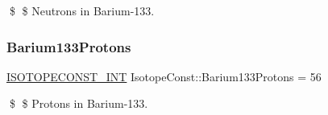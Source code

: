 \$ \$ Neutrons in Barium-\/133. \mbox{\label{group___isotope_const-_barium-_ba133_ga11f104e50b043f6fa6ef399f61146623}} 
\subsubsection{\texorpdfstring{Barium133\+Protons}{Barium133Protons}}
{\footnotesize\ttfamily \mbox{\hyperlink{group___isotope_const-_macros_ga5f18360b3e99483a35c32d789e62621c}{I\+S\+O\+T\+O\+P\+E\+C\+O\+N\+S\+T\+\_\+\+I\+NT}} Isotope\+Const\+::\+Barium133\+Protons = 56}

\$ \$ Protons in Barium-\/133. 